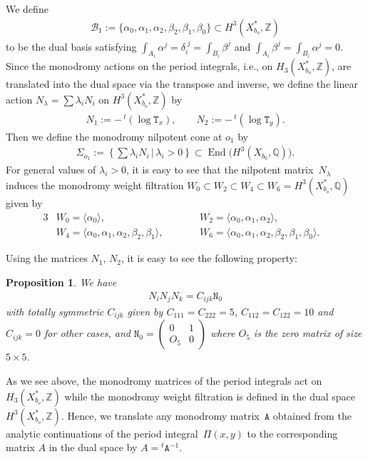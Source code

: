 \documentclass[pdftex]{sigma}
\numberwithin{equation}{section}
\newtheorem{Proposition}[Theorem]{Proposition}
\begin{document}
We define
\begin{gather}
\mathcal{B}_{1}:= \{ \alpha_{0},\alpha_{1},\alpha_{2},\beta_{2},\beta_{1},\beta_{0} \} \subset H^{3}(X_{b_{o}}^{*},\mathbb{Z})\label{eq:base-B1}
\end{gather}
to be the dual basis satisfying $\int_{A_{i}}\alpha^{j}=\delta_{i}^{\;j}=\int_{B_{i}}\beta^{j}$ and $\int_{A_{i}}\beta^{j}=\int_{B_{i}}\alpha^{j}=0$. Since the monodromy actions on the period integrals, i.e., on $H_{3}(X_{b_{o}}^{*},\mathbb{Z})$, are translated into the dual space via the transpose and inverse, we define the linear action $N_{\lambda}=\sum\lambda_{i}N_{i}$ on $H^{3}(X_{b_{o}}^{*},\mathbb{Z})$ by
\begin{gather*}
N_{1}:=-\,{}^{t}(\log\mathtt{T}_{x}),\qquad N_{2}:=-\,{}^{t}(\log\mathtt{T}_{y}).
\end{gather*}
Then we define the monodromy nilpotent cone at $o_{1}$ by
\begin{gather}
\Sigma_{o_{1}}:=\left\{ \sum\lambda_{i}N_{i}\,|\,\lambda_{i}>0\right\} \subset\operatorname{End}\big(H^{3}(X_{b_{0}},\mathbb{Q})\big).\label{eq:Cone1}
\end{gather}
For general values of $\lambda_{i}>0$, it is easy to see that the nilpotent matrix~$N_{\lambda}$ induces the monodromy weight filtration $W_{0}\subset W_{2}\subset W_{4}\subset W_{6}=H^{3}(X_{b_{o}}^{*},\mathbb{Q})$
given by
\begin{alignat}{3}
& W_{0}=\langle\alpha_{0}\rangle,\qquad && W_{2}=\langle\alpha_{0},\alpha_{1},\alpha_{2}\rangle,&\nonumber\\
& W_{4}=\langle\alpha_{0},\alpha_{1},\alpha_{2},\beta_{2},\beta_{1}\rangle,\qquad && W_{6}=\langle\alpha_{0},\alpha_{1},\alpha_{2},\beta_{2},\beta_{1},\beta_{0}\rangle.& \label{eq:W2i-filt}
\end{alignat}

Using the matrices $N_{1}$, $N_{2}$, it is easy to see the following property:
\begin{Proposition}\label{prop:Nijk-N0}We have
\begin{gather*}
N_{i}N_{j}N_{k}=C_{ijk}\mathtt{N}_{0}
\end{gather*}
with totally symmetric $C_{ijk}$ given by $C_{111}=C_{222}=5$, $C_{112}=C_{122}=10$ and $C_{ijk}=0$ for other cases, and $\mathtt{N}_{0}=\left(\begin{smallmatrix}0 & 1\\
O_{5} & 0
\end{smallmatrix}\right)$ where $O_{5}$ is the zero matrix of size $5\times5$.\end{Proposition}
\begin{Remark}\label{rem:T-and-dual-T} As we see above, the monodromy matrices of the period integrals act on $H_{3}(X_{b_{o}}^{*}{,}\mathbb{Z})$ while the monodromy weight filtration is defined in the dual space $H^{3}(X_{b_{o}}^{*},\mathbb{Z})$. Hence, we translate any monodromy matrix~$\mathtt{A}$ obtained from the analytic continuations of the period integ\-ral~$\Pi(x,y)$ to the corresponding matrix $A$ in the dual space by $A= {}^{t}\mathtt{A}^{-1}$.
\end{Remark}
\end{document}
